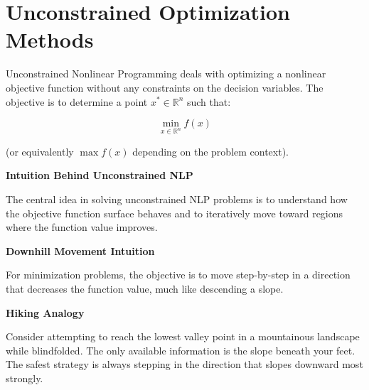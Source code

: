\documentclass[
  letterpaper,
  DIV=11,
  numbers=noendperiod]{scrreprt}
\begin{document}
\section{Unconstrained Optimization
Methods}\label{unconstrained-optimization-methods}

Unconstrained Nonlinear Programming deals with optimizing a nonlinear
objective function without any constraints on the decision variables.
The objective is to determine a point \(x^{*} \in \mathbb{R}^{n}\) such
that:

\[
\min_{x \in \mathbb{R}^{n}} f(x)
\]

(or equivalently \(\max f(x)\) depending on the problem context).

\textbf{Intuition Behind Unconstrained NLP}

The central idea in solving unconstrained NLP problems is to understand
how the objective function surface behaves and to iteratively move
toward regions where the function value improves.

\textbf{Downhill Movement Intuition}

For minimization problems, the objective is to move step-by-step in a
direction that decreases the function value, much like descending a
slope.

\textbf{Hiking Analogy}

Consider attempting to reach the lowest valley point in a mountainous
landscape while blindfolded. The only available information is the slope
beneath your feet. The safest strategy is always stepping in the
direction that slopes downward most strongly.
\end{document}
